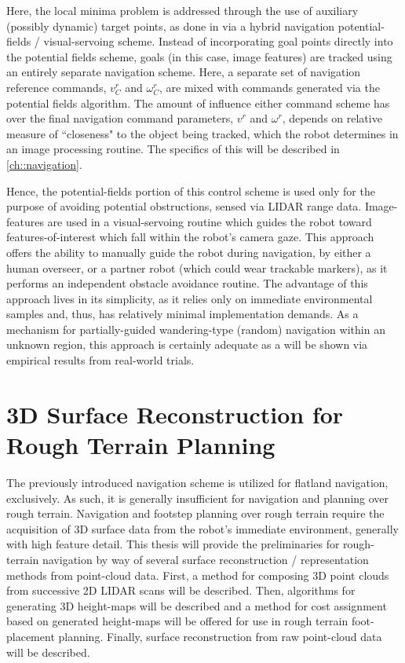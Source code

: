 		Here, the local minima problem is addressed through the use of auxiliary (possibly dynamic) target points, as done in \cite{ArambulaCosio2004} via a hybrid navigation potential-fields / visual-servoing scheme. Instead of incorporating goal points directly into the potential fields scheme, goals (in this case, image features) are tracked using an entirely separate navigation scheme. Here, a separate set of navigation reference commands, $v^{r}_{C}$ and $\omega^{r}_{C}$, are mixed with commands generated via the potential fields algorithm. The amount of influence either command scheme has over the final navigation command parameters, $v^{r}$ and $\omega^{r}$, depends on relative measure of ``closeness" to the object being tracked, which the robot determines in an image processing routine. The specifics of this will be described in \ref{ch::navigation}. 

		Hence, the potential-fields portion of this control scheme is used only for the purpose of avoiding potential obstructions, sensed via LIDAR range data. Image-features are used in a visual-servoing routine which guides the robot toward features-of-interest which fall within the robot’s camera gaze. This approach offers the ability to manually guide the robot during navigation, by either a human overseer, or a partner robot (which could wear trackable markers), as it performs an independent obstacle avoidance routine. The advantage of this approach lives in its simplicity, as it relies only on immediate environmental samples and, thus, has relatively minimal implementation demands.  As a mechanism for partially-guided wandering-type (random) navigation within an unknown region, this approach is certainly adequate as a will be shown via empirical results from real-world trials.




	\section{3D Surface Reconstruction for Rough Terrain Planning}

		The previously introduced navigation scheme is utilized for flatland navigation, exclusively. As such, it is generally insufficient for navigation and planning over rough terrain. Navigation and footstep planning over rough terrain require the acquisition of 3D surface data from the robot’s immediate environment, generally with high feature detail. This thesis will provide the preliminaries for rough-terrain navigation by way of several surface reconstruction / representation methods from point-cloud data. First, a method for composing 3D point clouds from successive 2D LIDAR scans will be described. Then, algorithms for generating 3D height-maps will be described and a method for cost assignment based on generated height-maps will be offered for use in rough terrain foot-placement planning. Finally, surface reconstruction from raw point-cloud data will be described.


